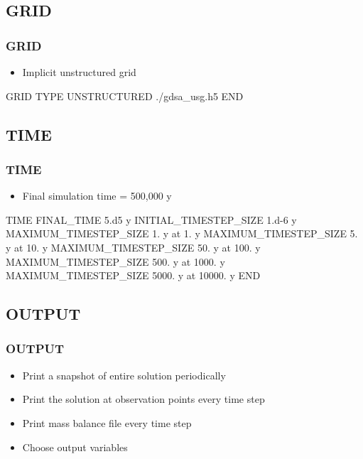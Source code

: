 \documentclass{beamer}
\begin{document}
\subsection{GRID}

\begin{frame}[fragile]\frametitle{GRID}

\begin{itemize}
  \item Implicit unstructured grid 
\end{itemize}

\begin{semiverbatim}
GRID
  TYPE UNSTRUCTURED ./gdsa_usg.h5
END
\end{semiverbatim}

\end{frame}

\subsection{TIME}

\begin{frame}[fragile]\frametitle{TIME}
\begin{itemize}
  \item Final simulation time = 500,000 y
\end{itemize}

\begin{semiverbatim}

TIME
  FINAL_TIME 5.d5 y
  INITIAL_TIMESTEP_SIZE 1.d-6 y
  MAXIMUM_TIMESTEP_SIZE 1. y at 1. y
  MAXIMUM_TIMESTEP_SIZE 5. y at 10. y
  MAXIMUM_TIMESTEP_SIZE 50. y at 100. y
  MAXIMUM_TIMESTEP_SIZE 500. y at 1000. y
  MAXIMUM_TIMESTEP_SIZE 5000. y at 10000. y
END
\end{semiverbatim}

\end{frame}

\subsection{OUTPUT}

\begin{frame}[fragile]\frametitle{OUTPUT}
\begin{itemize}
  \item Print a snapshot of entire solution periodically
  \item Print the solution at observation points every time step
  \item Print mass balance file every time step
  \item Choose output variables
\end{itemize}

\end{frame}
\end{document}
